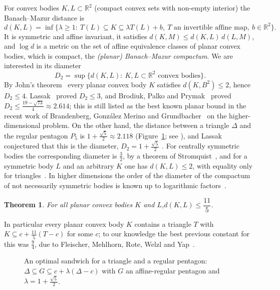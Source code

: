 \documentclass[11pt]{amsart}
\newtheorem{theorem}{Theorem}[section]
\theoremstyle{definition}
\theoremstyle{remark}
\newcommand{\dBM}{d}
\newcommand{\R}{\mathbb R}
\begin{document}
For convex bodies $K,L\subset\R^2$ (compact convex sets with non-empty interior) the
Banach--Mazur distance is
\[
  \dBM(K,L)=\inf\bigl\{\lambda\ge1:\ T(L)\subseteq K\subseteq\lambda T(L)+b,\ T \text{ an invertible affine map},\ b\in\R^2\bigr\}.
\]
It is symmetric and affine invariant, it satisfies $\dBM(K,M)\le\dBM(K,L)\,\dBM(L,M)$, and $\log\dBM$ is a
metric on the set of affine equivalence classes of planar convex bodies, which is compact, the
\emph{(planar) Banach--Mazur compactum}. We are interested in its diameter
\[
  D_2=\sup\{\dBM(K,L):\ K,L\subset\R^2 \text{ convex bodies}\}.
\]
By John's theorem~\cite{John} every planar convex body $K$ satisfies $\dBM(K,B^2)\le2$, hence $D_2\le4$.
Lassak~\cite{Lassak07} proved $D_2\le3$, and Brodiuk, Palko and Prymak~\cite{BPP} proved
$D_2\le\frac{19-\sqrt{73}}4\approx2.614$; this is still listed as the best known planar bound in the recent
work of Brandenberg, Gonz\'alez Merino and Grundbacher~\cite{BGG} on the higher-dimensional problem. On the other
hand, the distance between a triangle $\Delta$ and the regular pentagon $P_5$ is $1+\frac{\sqrt5}2\approx2.118$
(Figure~\ref{fig:sandwich}; see \cite{FMRWY,Lassak92,Kobos}), and Lassak conjectured that this is the diameter,
$D_2=1+\frac{\sqrt5}2$ \cite{Lassak92,Lassak07,Lassak14}. For centrally symmetric bodies the corresponding diameter
is $\frac32$, by a theorem of Stromquist~\cite{Stromquist}, and for a symmetric body $L$ and an arbitrary $K$ one has
$\dBM(K,L)\le2$, with equality only for triangles~\cite{Kobos}. In higher dimensions the order of the diameter of the
compactum of not necessarily symmetric bodies is known up to logarithmic factors~\cite{Rudelson00,BK}.

\begin{theorem}\label{thm:main}
For all planar convex bodies $K$ and $L$,\quad $\dBM(K,L)\le\dfrac{11}{5}$.
\end{theorem}

In particular every planar convex body $K$ contains a triangle $T$ with $K\subseteq c+\frac{11}5(T-c)$ for some $c$; to
our knowledge the best previous constant for this was $\frac94$, due to Fleischer, Mehlhorn, Rote, Welzl and
Yap~\cite{FMRWY}.

\begin{figure}[t]
\centering
{}
\caption{An optimal sandwich for a triangle and a regular pentagon: $\Delta\subseteq G\subseteq c+\lambda(\Delta-c)$ with
$G$ an affine-regular pentagon and $\lambda=1+\frac{\sqrt5}2$.}
\label{fig:sandwich}
\end{figure}
\end{document}
